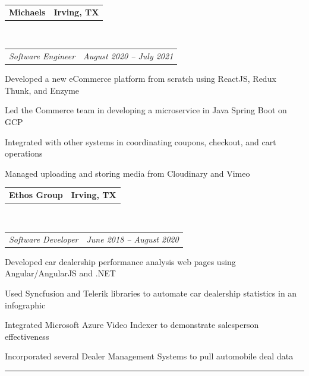 \documentclass[11pt,letterpaper]{article}
\makeatletter
\newenvironment{indentsection}[1]%
{\begin{list}{}%
	{\setlength{\leftmargin}{#1}}%
	\item[]%
}
{\end{list}}
\newcommand{\headerrow}[2]
{\begin{tabular*}{\linewidth}{l@{\extracolsep{\fill}}r}
	#1 &
	#2 \\
\end{tabular*}}
\makeatother
\begin{document}
\begin{indentsection}{\parindent}
	\vspace{-0.4em}
	\headerrow
		{\textbf{Michaels}}
		{\textbf{Irving, TX}}
	\\
	\headerrow
		{\emph{Software Engineer}}
		{\emph{August 2020 -- July 2021}}
	\begin{itemize*}
		\item Developed a new eCommerce platform from scratch using ReactJS, Redux Thunk, and Enzyme
		\item Led the Commerce team in developing a microservice in Java Spring Boot on GCP
		\item Integrated with other systems in coordinating coupons, checkout, and cart operations
		\item Managed uploading and storing media from Cloudinary and Vimeo
	\end{itemize*}
\end{indentsection}
\begin{indentsection}{\parindent}
	\vspace{-0.4em}
	\headerrow
		{\textbf{Ethos Group}}
		{\textbf{Irving, TX}}
	\\
	\headerrow
		{\emph{Software Developer}}
		{\emph{June 2018 -- August 2020}}
	\begin{itemize*}
		\item Developed car dealership performance analysis web pages using Angular/AngularJS and .NET
		\item Used Syncfusion and Telerik libraries to automate car dealership statistics in an infographic
		\item Integrated Microsoft Azure Video Indexer to demonstrate salesperson effectiveness 
		\item Incorporated several Dealer Management Systems to pull automobile deal data
	\end{itemize*}
\end{indentsection}

\hrule
\vspace{-0.8em}
\end{document}
